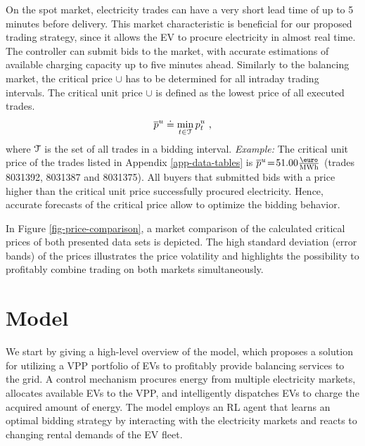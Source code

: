 \documentclass[a4paper, 12pt]{article}
\begin{document}
On the spot market, electricity trades can have a very short lead time of up to
5 minutes before delivery. This market characteristic is beneficial for our
proposed trading strategy, since it allows the EV to procure electricity in
almost real time. The controller can submit bids to the market, with accurate
estimations of available charging capacity up to five minutes ahead. Similarly
to the balancing market, the critical price \(\cup{}\) has to be determined for
all intraday trading intervals. The critical unit price \(\cup{}\) is defined as
the lowest price of all executed trades.
\begin{equation*}
    \overline p^u_{} \doteq \min_{t \in \cal{T}} p^u_{t} \text{ ,}
\end{equation*}
where \(\cal{T}\) is the set of all trades in a bidding interval. \emph{Example:} The
critical unit price of the trades listed in Appendix \ref{app-data-tables} is
\(\cup{} \!=\!51.00 \emwh\) (trades 8031392, 8031387 and 8031375). All buyers that
submitted bids with a price higher than the critical unit price successfully
procured electricity. Hence, accurate forecasts of the critical price allow to
optimize the bidding behavior.

In Figure \ref{fig-price-comparison}, a market comparison of the calculated
critical prices of both presented data sets is depicted. The high standard
deviation (error bands) of the prices illustrates the price volatility and
highlights the possibility to profitably combine trading on both markets
simultaneously.

\clearpage

\section{Model}
\label{sec:org6dd0162}
We start by giving a high-level overview of the model, which proposes a solution
for utilizing a VPP portfolio of EVs to profitably provide balancing services to
the grid. A control mechanism procures energy from multiple electricity markets,
allocates available EVs to the VPP, and intelligently dispatches EVs to charge
the acquired amount of energy. The model employs an RL agent that learns an
optimal bidding strategy by interacting with the electricity markets and reacts
to changing rental demands of the EV fleet.
\end{document}
